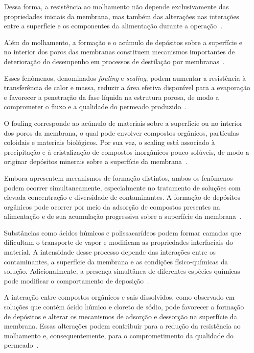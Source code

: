 Dessa forma, a resistência ao molhamento não depende exclusivamente das propriedades iniciais da membrana, mas também das alterações nas interações entre a superfície e os componentes da alimentação durante a operação~\cite{Yao2020WettabilityMD,Yang2021Antiwetting,Zhang2023Antiwetting}.

Além do molhamento, a formação e o acúmulo de depósitos sobre a superfície e no interior dos poros das membranas constituem mecanismos importantes de deterioração do desempenho em processos de destilação por membranas~\cite{AbdelKarim2021,Hsieh2024ScalingWetting,Du2023Antifouling}. 

Esses fenômenos, denominados \textit{fouling} e \textit{scaling}, podem aumentar a resistência à transferência de calor e massa, reduzir a área efetiva disponível para a evaporação e favorecer a penetração da fase líquida na estrutura porosa, de modo a comprometer o fluxo e a qualidade do permeado produzido~\cite{AbdelKarim2021,Hsieh2024ScalingWetting,Du2023Antifouling}.

O fouling corresponde ao acúmulo de materiais sobre a superfície ou no interior dos poros da membrana, o qual pode envolver compostos orgânicos, partículas coloidais e materiais biológicos. Por sua vez, o scaling está associado à precipitação e à cristalização de compostos inorgânicos pouco solúveis, de modo a originar depósitos minerais sobre a superfície da membrana~\cite{AbdelKarim2021,Hsieh2024ScalingWetting,Du2023Antifouling}. 

Embora apresentem mecanismos de formação distintos, ambos os fenômenos podem ocorrer simultaneamente, especialmente no tratamento de soluções com elevada concentração e diversidade de contaminantes. A formação de depósitos orgânicos pode ocorrer por meio da adsorção de compostos presentes na alimentação e de sua acumulação progressiva sobre a superfície da membrana~\cite{AbdelKarim2021,Hsieh2024ScalingWetting,Du2023Antifouling}.

Substâncias como ácidos húmicos e polissacarídeos podem formar camadas que dificultam o transporte de vapor e modificam as propriedades interfaciais do material. A intensidade desse processo depende das interações entre os contaminantes, a superfície da membrana e as condições físico-químicas da solução. Adicionalmente, a presença simultânea de diferentes espécies químicas pode modificar o comportamento de deposição~\cite{AbdelKarim2021,Hsieh2024ScalingWetting,Du2023Antifouling}.

A interação entre compostos orgânicos e sais dissolvidos, como observado em soluções que contém ácido húmico e cloreto de sódio, pode favorecer a formação de depósitos e alterar os mecanismos de adsorção e dessorção na superfície da membrana. Essas alterações podem contribuir para a redução da resistência ao molhamento e, consequentemente, para o comprometimento da qualidade do permeado~\cite{AbdelKarim2021,Hsieh2024ScalingWetting,Du2023Antifouling}.

